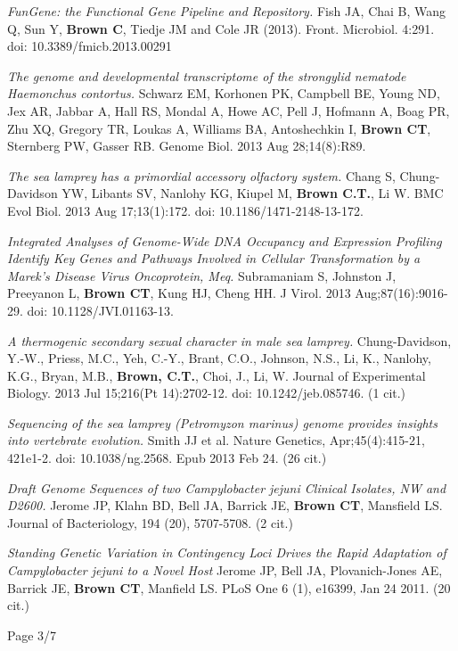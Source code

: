 \documentclass[margin,line]{resume}
\begin{document}
\begin{resume}
{\em FunGene: the Functional Gene Pipeline and Repository.} Fish JA, Chai B, Wang Q, Sun Y, {\bf Brown C}, Tiedje JM and Cole JR (2013).  Front. Microbiol. 4:291. doi: 10.3389/fmicb.2013.00291

{\em The genome and developmental transcriptome of the strongylid
  nematode Haemonchus contortus.}  Schwarz EM, Korhonen PK, Campbell
BE, Young ND, Jex AR, Jabbar A, Hall RS, Mondal A, Howe AC, Pell J,
Hofmann A, Boag PR, Zhu XQ, Gregory TR, Loukas A, Williams BA,
Antoshechkin I, {\bf Brown CT}, Sternberg PW, Gasser RB.  Genome
Biol. 2013 Aug 28;14(8):R89.

{\em The sea lamprey has a primordial accessory olfactory system.}
Chang S, Chung-Davidson YW, Libants SV, Nanlohy KG, Kiupel M, {\bf
  Brown C.T.}, Li W. BMC Evol Biol. 2013 Aug 17;13(1):172. doi:
10.1186/1471-2148-13-172.

{\em Integrated Analyses of Genome-Wide DNA Occupancy and Expression
  Profiling Identify Key Genes and Pathways Involved in Cellular
  Transformation by a Marek's Disease Virus Oncoprotein, Meq.}
Subramaniam S, Johnston J, Preeyanon L, {\bf Brown CT}, Kung HJ, Cheng
HH. J Virol. 2013 Aug;87(16):9016-29. doi: 10.1128/JVI.01163-13.

{\em A thermogenic secondary sexual character in male sea lamprey.}
Chung-Davidson, Y.-W., Priess, M.C., Yeh, C.-Y., Brant, C.O., Johnson,
N.S., Li, K., Nanlohy, K.G., Bryan, M.B., {\bf Brown, C.T.}, Choi, J.,
Li, W. Journal of Experimental Biology. 2013 Jul 15;216(Pt
14):2702-12. doi: 10.1242/jeb.085746. (1 cit.)

{\em Sequencing of the sea lamprey (Petromyzon marinus) genome provides insights into vertebrate evolution.} Smith JJ et al. Nature Genetics, Apr;45(4):415-21, 421e1-2. doi: 10.1038/ng.2568. Epub 2013 Feb 24. (26 cit.)

{\em Draft Genome Sequences of two Campylobacter jejuni Clinical Isolates,
NW and D2600.} Jerome JP, Klahn BD, Bell JA, Barrick JE, {\bf Brown CT}, Mansfield LS. Journal of Bacteriology, 194 (20), 5707-5708. (2 cit.)

{\em Standing Genetic Variation in Contingency Loci Drives the Rapid
  Adaptation of Campylobacter jejuni to a Novel Host} Jerome JP, Bell
JA, Plovanich-Jones AE, Barrick JE, {\bf Brown CT}, Manfield LS.  PLoS One 6
(1), e16399, Jan 24 2011. (20 cit.)

\vspace{2cm}
{\centerline {Page 3/7}}

\newpage


\end{resume}
\end{document}
